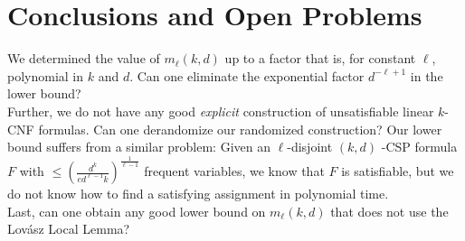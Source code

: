 \documentclass[envcountsect, envcountsame]{llncs}
\begin{document}
\section{Conclusions and Open Problems}

We determined the value of $m_\ell(k,d)$ up to a factor that is,
for constant $\ell$, polynomial in $k$ and $d$. Can one eliminate
the exponential factor $d^{-\ell +1}$ in the lower bound? \\

Further, we do not have any good {\em explicit} construction of
unsatisfiable linear $k$-CNF formulas. Can one derandomize our
randomized construction? Our lower bound suffers from a similar
problem: Given an $\ell$-disjoint $(k,d)$ -CSP formula $F$ with $\leq
\left(\frac{d^k}{ed^{\ell-1}k}\right)^{\frac{1}{\ell -1}}$ frequent
variables, we know that $F$ is satisfiable, but we do not know how to
find a satisfying assignment in polynomial time.\\

Last, can one obtain any good lower bound on $m_\ell(k,d)$ that does
not use the Lov\'asz Local Lemma? 




\end{document}
